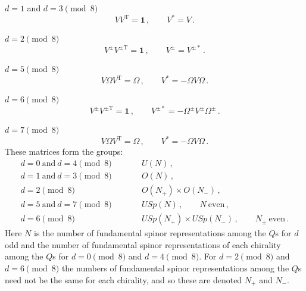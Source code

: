 \medskip
\noindent \(d=1\) and \(d=3\pmod 8\)
\begin{equation}
  VV^{\mathrm T}=\mathbf{1}\,,
  \qquad V^*=V\,.
  \tag{32.1.50}\label{eq:32.1.50}
\end{equation}

\medskip
\noindent \(d=2\pmod 8\)
\begin{equation}
  V^\pm V^{\pm\mathrm T}=\mathbf{1}\,,
  \qquad V^\pm=V^{\pm*}\,.
  \tag{32.1.51}\label{eq:32.1.51}
\end{equation}

\medskip
\noindent \(d=5\pmod 8\)
\begin{equation}
  V\Omega V^{\mathrm T}=\Omega\,,
  \qquad V^*=-\Omega V\Omega\,.
  \tag{32.1.52}\label{eq:32.1.52}
\end{equation}

\medskip
\noindent \(d=6\pmod 8\)
\begin{equation}
  V^\pm V^{\pm\mathrm T}=\mathbf{1}\,,
  \qquad V^{\pm*}=-\Omega^\pm V^\pm\Omega^\pm\,.
  \tag{32.1.53}\label{eq:32.1.53}
\end{equation}

\medskip
\noindent \(d=7\pmod 8\)
\begin{equation}
  V\Omega V^{\mathrm T}=\Omega\,,
  \qquad V^*=-\Omega V\Omega\,.
  \tag{32.1.54}\label{eq:32.1.54}
\end{equation}
These matrices form the groups:
\[
  \begin{array}{rcl}
    d=0\ \text{and}\ d=4\pmod 8
      &\qquad& U(N)\,,
    \\[4pt]
    d=1\ \text{and}\ d=3\pmod 8
      && O(N)\,,
    \\[4pt]
    d=2\pmod 8
      && O(N_+)\times O(N_-)\,,
    \\[4pt]
    d=5\ \text{and}\ d=7\pmod 8
      && USp(N)\,,\qquad N\ \text{even}\,,
    \\[4pt]
    d=6\pmod 8
      && USp(N_+)\times USp(N_-)\,,
         \qquad N_\pm\ \text{even}\,.
  \end{array}
\]
Here \(N\) is the number of fundamental spinor representations among the
\(Q\)s for \(d\) odd and the number of fundamental spinor representations
of each chirality among the \(Q\)s for \(d=0\pmod 8\) and
\(d=4\pmod 8\). For \(d=2\pmod 8\) and \(d=6\pmod 8\) the numbers of
fundamental spinor representations among the \(Q\)s need not be the same
for each chirality, and so these are denoted \(N_+\) and \(N_-\).

